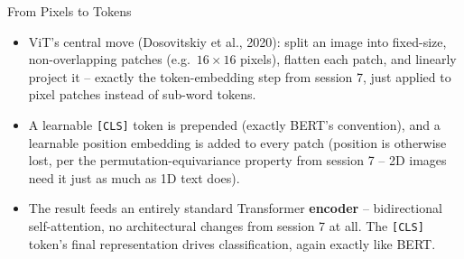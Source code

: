 \begin{vbframe}{From Pixels to Tokens}
\begin{itemize}
  \item ViT's central move (Dosovitskiy et al., 2020): split an image into fixed-size, non-overlapping patches (e.g.\ $16\times16$ pixels), flatten each patch, and linearly project it -- exactly the token-embedding step from session 7, just applied to pixel patches instead of sub-word tokens.
\end{itemize}

\begin{center}
\end{center}

\begin{itemize}
  \item A learnable {\tt [CLS]} token is prepended (exactly BERT's convention), and a learnable position embedding is added to every patch (position is otherwise lost, per the permutation-equivariance property from session 7 -- 2D images need it just as much as 1D text does).
  \item The result feeds an entirely standard Transformer \textbf{encoder} -- bidirectional self-attention, no architectural changes from session 7 at all. The {\tt [CLS]} token's final representation drives classification, again exactly like BERT.
\end{itemize}

\framebreak


\end{vbframe}
